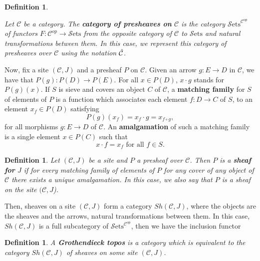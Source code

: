 \documentclass[10pt,longbibliography]{article}
\newtheorem{Def}[Theo]{Definition}
\newcommand{\C}{\mathcal{C}}
\newcommand{\Sets}{\mathcal{S}\text{ets}}
\begin{document}
\begin{Def}\label{categoryofpresheavesdef}
	
	Let $\C$ be a category. The \textbf{category of presheaves on} $\C$ is the category ${\Sets}^{\C^{op}}$ of functors $F: \C^{op} \to \Sets$ from the opposite category of $\C$ to $\Sets$ and natural transformations between them. In this case, we represent this category of presheaves over $\C$ using the notation $\Hat{\C}$. 
	
\end{Def}

Now, fix a site $(\C,J)$ and a presheaf $P$ on $\C$. Given an arrow $g: E \to D$ in $\C$, we have that $P(g) : P(D) \to P(E)$. For all $x \in P(D)$, $x \cdot g$ stands for $P(g)(x)$.  If $S$ is sieve and covers an object $C$ of $\C$, a \textbf{matching family} for $S$ of elements of $P$ is a function which associates each element $f: D \to C$ of $S$, to an element $x_{f} \in P(D)$ satisfying $$P(g)(x_{f}) = x_{f} \cdot g = x_{f\circ g},$$ for all morphisms $g: E \to D$ of $\C$. An \textbf{amalgamation} of such a matching family is a single element $x \in P(C)$ such that $$x \cdot f = x_{f} \text{ for all } f \in S.$$

\begin{Def}\label{Sheafdef}
	Let $(\C,J)$ be a site and $P$ a presheaf over $\C$. Then $P$ is a \textbf{sheaf for} $J$ if for every matching family  of elements of $P$ for any cover of any object of $\C$ there exists a unique amalgamation. In this case, we also say that $P$ is a sheaf on the site $(\C,J$).
\end{Def}

Then, sheaves on a site $(\C,J)$ form a category $Sh(\C,J)$, where the objects are the sheaves and the arrows, natural transformations between them. In this case, $Sh(\C, J)$ is a full subcategory of $\Sets^{\C^{op}}$, then we have the inclusion functor

\begin{center}
\end{center}

\begin{Def}
	A \textbf{Grothendieck topos} is a category which is equivalent to the category $Sh(\C,J)$ of sheaves on some site $(\C,J)$.
\end{Def}
\end{document}
